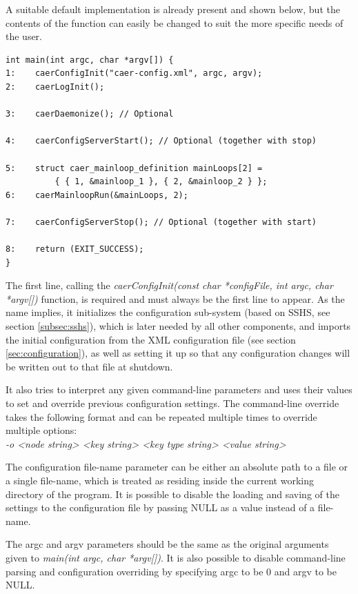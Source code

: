 \documentclass[a4paper,12pt]{report}
\begin{document}
A suitable default implementation is already present and shown below, but the contents of the function can easily be changed to suit the more specific needs of the user.
\clearpage
\begin{lstlisting}
int main(int argc, char *argv[]) {
1:    caerConfigInit("caer-config.xml", argc, argv);
2:    caerLogInit();
    
3:    caerDaemonize(); // Optional
    
4:    caerConfigServerStart(); // Optional (together with stop)
    
5:    struct caer_mainloop_definition mainLoops[2] =
          { { 1, &mainloop_1 }, { 2, &mainloop_2 } };
6:    caerMainloopRun(&mainLoops, 2);
    
7:    caerConfigServerStop(); // Optional (together with start)
    
8:    return (EXIT_SUCCESS);
}
\end{lstlisting}

The first line, calling the \emph{caerConfigInit(const char *configFile, int argc, char *argv[])} function, is required and must always be the first line to appear. As the name implies, it initializes the configuration sub-system (based on SSHS, see section \ref{subsec:sshs}), which is later needed by all other components, and imports the initial configuration from the XML configuration file (see section \ref{sec:configuration}), as well as setting it up so that any configuration changes will be written out to that file at shutdown.

It also tries to interpret any given command-line parameters and uses their values to set and override previous configuration settings.
The command-line override takes the following format and can be repeated multiple times to override multiple options:
\\\emph{-o <node string> <key string> <key type string> <value string>}

The configuration file-name parameter can be either an absolute path to a file or a single file-name, which is treated as residing inside the current working directory of the program.
It is possible to disable the loading and saving of the settings to the configuration file by passing NULL as a value instead of a file-name.

The argc and argv parameters should be the same as the original arguments given to \emph{main(int argc, char *argv[])}.
It is also possible to disable command-line parsing and configuration overriding by specifying argc to be 0 and argv to be NULL.
\end{document}
